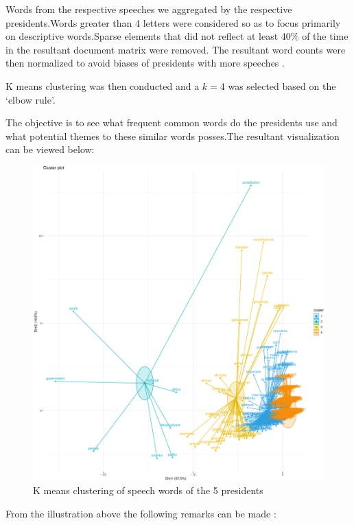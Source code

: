 \documentclass[]{article}
\begin{document}
Words from the respective speeches we aggregated by the respective
presidents.Words greater than 4 letters were considered so as to focus
primarily on descriptive words.Sparse elements that did not reflect at
least 40\% of the time in the resultant document matrix were removed.
The resultant word counts were then normalized to avoid biases of
presidents with more speeches .

K means clustering was then conducted and a \(k=4\) was selected based
on the `elbow rule'.

The objective is to see what frequent common words do the presidents use
and what potential themes to these similar words posses.The resultant
visualization can be viewed below:

\begin{figure}[H]

{\centering \includegraphics{datasci_fi_Assignment_2_files/figure-latex/kmeans -1} 

}

\caption{K means clustering of speech words of the 5 presidents}\label{fig:kmeans }
\end{figure}

From the illustration above the following remarks can be made :
\end{document}
